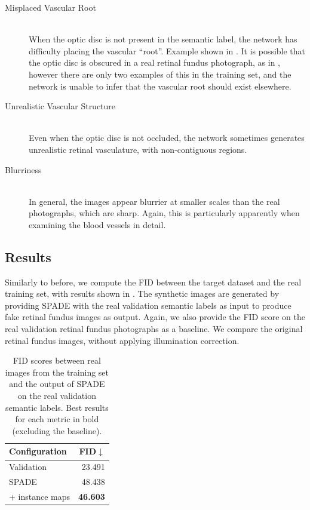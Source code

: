 \begin{description}
    \item[Misplaced Vascular Root] \hfill \\
    When the optic disc is not present in the semantic label, the network has difficulty placing the vascular ``root''.
    Example shown in .
    It is possible that the optic disc is obscured in a real retinal fundus photograph, as in , however there are only two examples of this in the training set, and the network is unable to infer that the vascular root should exist elsewhere.
    
    \item[Unrealistic Vascular Structure] \hfill \\
    Even when the optic disc is not occluded, the network sometimes generates unrealistic retinal vasculature, with non-contiguous regions.
    
    \item[Blurriness] \hfill \\
    In general, the images appear blurrier at smaller scales than the real photographs, which are sharp.
    Again, this is particularly apparently when examining the blood vessels in detail.
\end{description}

\subsection{Results}

Similarly to before, we compute the FID between the target dataset and the real training set, with results shown in .
The synthetic images are generated by providing SPADE with the real validation semantic labels as input to produce fake retinal fundus images as output.
Again, we also provide the FID score on the real validation retinal fundus photographs as a baseline.
We compare the original retinal fundus images, without applying illumination correction.

\begin{table}[h]
    \centering
    \begin{tabular}{lr}
        \toprule
        Configuration & FID$\downarrow$ \\
        \midrule
        Validation & 23.491 \\
        \midrule
        SPADE & 48.438 \\
        + instance maps & \textbf{46.603} \\
        \bottomrule
    \end{tabular}
    \caption{FID scores between real images from the training set and the output of SPADE on the real validation semantic labels. Best results for each metric in bold (excluding the baseline).}
    \label{tab:spade_validation}
\end{table}

